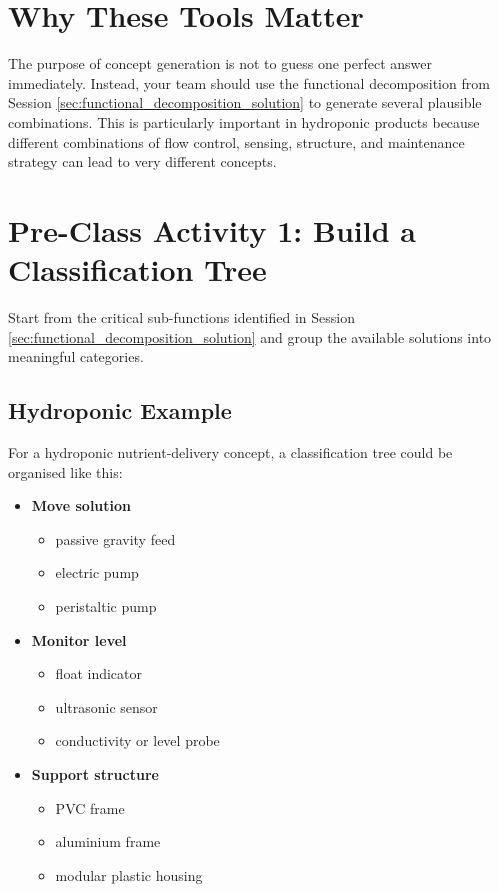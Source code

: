 \section{Why These Tools Matter}

The purpose of concept generation is not to guess one perfect answer immediately. Instead, your team should use the functional decomposition from Session \ref{sec:functional_decomposition_solution} to generate several plausible combinations. This is particularly important in hydroponic products because different combinations of flow control, sensing, structure, and maintenance strategy can lead to very different concepts.

\section{Pre-Class Activity 1: Build a Classification Tree}

Start from the critical sub-functions identified in Session \ref{sec:functional_decomposition_solution} and group the available solutions into meaningful categories.

\subsection{Hydroponic Example}

For a hydroponic nutrient-delivery concept, a classification tree could be organised like this:
\begin{itemize}
    \item \textbf{Move solution}
    \begin{itemize}
        \item passive gravity feed
        \item electric pump
        \item peristaltic pump
    \end{itemize}
    \item \textbf{Monitor level}
    \begin{itemize}
        \item float indicator
        \item ultrasonic sensor
        \item conductivity or level probe
    \end{itemize}
    \item \textbf{Support structure}
    \begin{itemize}
        \item PVC frame
        \item aluminium frame
        \item modular plastic housing
    \end{itemize}
\end{itemize}


